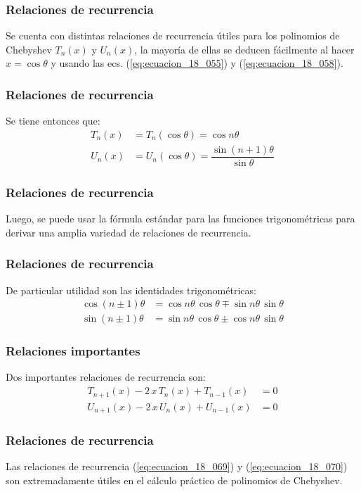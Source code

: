 \documentclass[12pt]{beamer}
\begin{document}
\begin{frame}
\frametitle{Relaciones de recurrencia}
Se cuenta con distintas relaciones de recurrencia útiles para los polinomios de Chebyshev $T_{n}(x)$ y $U_{n}(x)$, la mayoría de ellas se deducen fácilmente al hacer $x = \cos \theta$ y usando las ecs. (\ref{eq:ecuacion_18_055}) y (\ref{eq:ecuacion_18_058}).
\end{frame}
\begin{frame}
\frametitle{Relaciones de recurrencia}
Se tiene entonces que:
\pause
\begin{align}
T_{n} (x) &= T_{n} (\cos \theta) = \cos n \theta \label{eq:ecuacion_18_065} \\[0.5em]
U_{n} (x) &= U_{n} (\cos \theta) = \dfrac{\sin (n + 1) \theta}{\sin \theta} \label{eq:ecuacion_18_066} 
\end{align}
\end{frame}
\begin{frame}
\frametitle{Relaciones de recurrencia}
Luego, se puede usar la fórmula estándar para las funciones trigonométricas para derivar una amplia variedad de relaciones de recurrencia.
\end{frame}
\begin{frame}
\frametitle{Relaciones de recurrencia}
De particular utilidad son las identidades trigonométricas:
\pause
\begin{align}
\cos (n \pm 1)\theta &= \cos n \theta \, \cos \theta \mp \sin n \theta \, \sin \theta \label{eq:ecuacion_18_067} \\[0.5em]
\sin (n \pm 1)\theta &= \sin n \theta \, \cos \theta \pm \cos n \theta \, \sin \theta \label{eq:ecuacion_18_068}
\end{align}
\end{frame}
\begin{frame}
\frametitle{Relaciones importantes}
Dos importantes relaciones de recurrencia son:
\pause
\begin{align}
T_{n+1} (x) - 2 \, x \, T_{n} (x) + T_{n-1} (x) &= 0 \label{eq:ecuacion_18_069} \\[0.5em]
U_{n+1} (x) - 2 \, x \, U_{n} (x) + U_{n-1} (x) &= 0 \label{eq:ecuacion_18_070}
\end{align}
\end{frame}
\begin{frame}
\frametitle{Relaciones de recurrencia}
Las relaciones de recurrencia (\ref{eq:ecuacion_18_069}) y (\ref{eq:ecuacion_18_070}) son extremadamente útiles en el cálculo práctico de polinomios de Chebyshev.
\end{frame}
\end{document}
